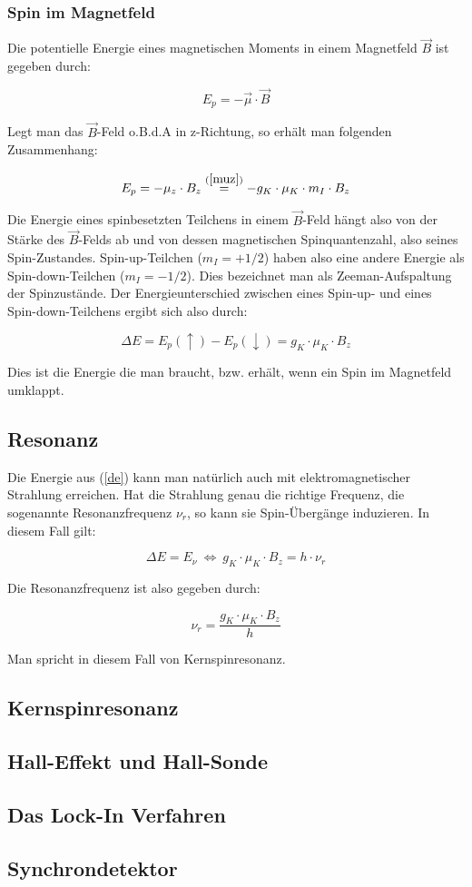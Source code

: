 \subsubsection{Spin im Magnetfeld}

Die potentielle Energie eines magnetischen Moments in einem Magnetfeld $\vec B$ ist gegeben durch:

$$ E_p = -\vec\mu\cdot\vec B $$

Legt man das $\vec B$-Feld o.B.d.A in z-Richtung, so erhält man folgenden Zusammenhang:

$$ E_p = -\mu_z\cdot B_z \stackrel{(\ref{muz})}{=} -g_K \cdot \mu_K \cdot m_I\cdot B_z $$

Die Energie eines spinbesetzten Teilchens in einem $\vec B$-Feld hängt also von der Stärke des $\vec B$-Felds ab und von dessen magnetischen Spinquantenzahl, also seines Spin-Zustandes. Spin-up-Teilchen ($m_I = +1/2$) haben also eine andere Energie als Spin-down-Teilchen ($m_I = -1/2$). Dies bezeichnet man als Zeeman-Aufspaltung der Spinzustände. Der Energieunterschied zwischen eines Spin-up- und eines Spin-down-Teilchens ergibt sich also durch:

\begin{equation} \Delta E = E_p(\uparrow) - E_p(\downarrow) =  g_K \cdot \mu_K \cdot B_z \label{de} \end{equation}

Dies ist die Energie die man braucht, bzw. erhält, wenn ein Spin im Magnetfeld umklappt.

\subsection{Resonanz}

Die Energie aus (\ref{de}) kann man natürlich auch mit elektromagnetischer Strahlung erreichen. Hat die Strahlung genau die richtige Frequenz, die sogenannte Resonanzfrequenz $\nu_r$, so kann sie Spin-Übergänge induzieren. In diesem Fall gilt:

$$ \Delta E = E_\nu \ \Leftrightarrow \ g_K \cdot \mu_K \cdot B_z = h\cdot \nu_r $$

Die Resonanzfrequenz ist also gegeben durch:

$$ \nu_r = \frac{g_K \cdot \mu_K \cdot B_z}{h} $$

Man spricht in diesem Fall von Kernspinresonanz.




\subsection{Kernspinresonanz}


\subsection{Hall-Effekt und Hall-Sonde}

\subsection{Das Lock-In Verfahren}

\subsection{Synchrondetektor}